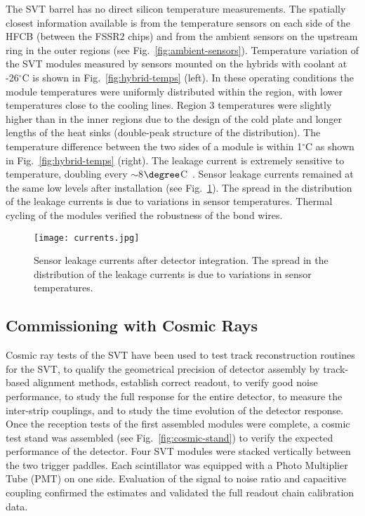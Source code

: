 The SVT barrel has no direct silicon temperature measurements. The spatially closest information available is from the temperature sensors on each side of the HFCB (between the FSSR2 chips) and from the ambient sensors on the upstream ring in the outer regions (see Fig.~\ref{fig:ambient-sensors}). Temperature variation of the SVT modules measured by sensors mounted on the hybrids with coolant at -26$^\circ$C is shown in Fig.~\ref{fig:hybrid-temps} (left). In these operating conditions the module temperatures were uniformly distributed within the region, with lower temperatures close to the cooling lines. Region 3 temperatures were slightly higher than in the inner regions due to the design of the cold plate and longer lengths of the heat sinks (double-peak structure of the distribution). The temperature difference between the two sides of a module is within 1$^\circ$C as shown in Fig.~\ref{fig:hybrid-temps} (right). The leakage current is extremely sensitive to temperature, doubling every $\sim$8$\degree$C~\cite{SZE}. Sensor leakage currents remained at the same low levels after installation (see Fig.~\ref{fig:currents}). The spread in the distribution of the leakage currents is due to variations in sensor temperatures. Thermal cycling of the modules verified the robustness of the bond wires.

\begin{figure}[hbt] 
\centering 
\texttt{[image: currents.jpg]}
\caption{Sensor leakage currents after detector integration. The spread in the distribution of the leakage currents is due to variations in sensor temperatures.}
\label{fig:currents}
\end{figure}

\subsection{Commissioning with Cosmic Rays}

Cosmic ray tests of the SVT have been used to test track reconstruction routines for the SVT, to qualify the geometrical precision of detector assembly by track-based alignment methods, establish correct readout, to verify good noise performance, to study the full response for the entire detector, to measure the inter-strip couplings, and to study the time evolution of the detector response. Once the reception tests of the first assembled modules were complete, a cosmic test stand was assembled (see Fig.~\ref{fig:cosmic-stand}) to verify the expected performance of the detector. Four SVT modules were stacked vertically between the two trigger paddles. Each scintillator was equipped with a Photo Multiplier Tube (PMT) on one side. Evaluation of the signal to noise ratio and capacitive coupling confirmed the estimates and validated the full readout chain calibration data.

